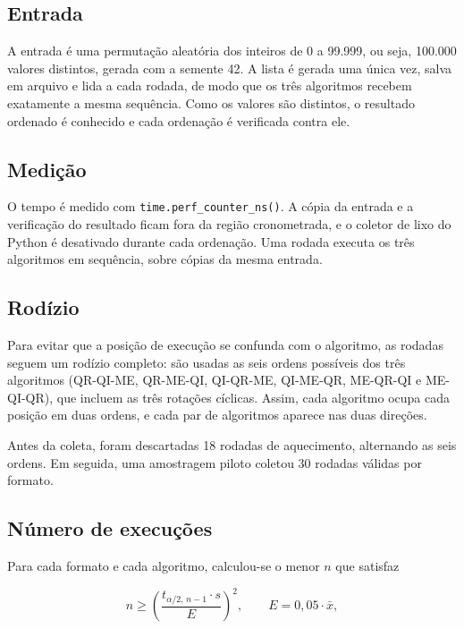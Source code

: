 \documentclass[12pt]{article}
\begin{document}
\subsection{Entrada}

A entrada é uma permutação aleatória dos inteiros de 0 a 99.999, ou seja, 100.000
valores distintos, gerada com a semente 42. A lista é gerada uma única vez,
salva em arquivo e lida a cada rodada, de modo que os três algoritmos recebem
exatamente a mesma sequência. Como os valores são distintos, o resultado
ordenado é conhecido e cada ordenação é verificada contra ele.

\subsection{Medição}

O tempo é medido com \texttt{time.perf\_counter\_ns()}. A cópia da entrada e a
verificação do resultado ficam fora da região cronometrada, e o coletor de lixo
do Python é desativado durante cada ordenação. Uma rodada executa os três
algoritmos em sequência, sobre cópias da mesma entrada.

\subsection{Rodízio}

Para evitar que a posição de execução se confunda com o algoritmo, as rodadas
seguem um rodízio completo: são usadas as seis ordens possíveis dos três
algoritmos (QR-QI-ME, QR-ME-QI, QI-QR-ME, QI-ME-QR, ME-QR-QI e ME-QI-QR), que
incluem as três rotações cíclicas. Assim, cada algoritmo ocupa cada posição em
duas ordens, e cada par de algoritmos aparece nas duas direções.

Antes da coleta, foram descartadas 18 rodadas de aquecimento, alternando as
seis ordens. Em seguida, uma amostragem piloto coletou 30 rodadas válidas por
formato.

\subsection{Número de execuções}

Para cada formato e cada algoritmo, calculou-se o menor $n$ que satisfaz

\begin{equation}
  n \geq \left(\frac{t_{\alpha/2,\,n-1}\cdot s}{E}\right)^2,
  \qquad E = 0{,}05\cdot\bar{x},
\end{equation}
\end{document}
